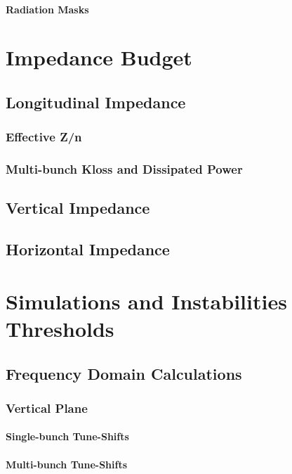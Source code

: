 \documentclass[
	12pt,				%
	openright,			%
	oneside,			%
	a4paper,		%
	chapter=TITLE,		%
	section=TITLE,		%
    brazil,				%
	english,			%
	sumario=tradicional,
	]{abntex2}
\begin{document}
        \paragraph{Radiation Masks}
    \subsection{}
  \section{Impedance Budget}
    \subsection{Longitudinal Impedance}
      \subsubsection{Effective Z/n}
      \subsubsection{Multi-bunch Kloss and Dissipated Power}
    \subsection{Vertical Impedance}
    \subsection{Horizontal Impedance}
  \section{Simulations and Instabilities Thresholds}
    \subsection{Frequency Domain Calculations}
      \subsubsection{Vertical Plane}
        \paragraph{Single-bunch Tune-Shifts}
        \paragraph{Multi-bunch Tune-Shifts}
\end{document}
